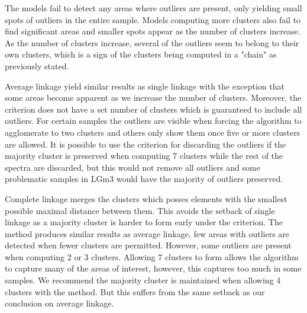 The models fail to detect any areas where outliers are present, only yielding small spots of outliers in the entire sample. Models computing more clusters also fail to find significant areas and smaller spots appear as the number of clusters increase. As the number of clusters increase, several of the outliers seem to belong to their own clusters, which is a sign of the clusters being computed in a "chain" as previously stated.


Average linkage yield similar results as single linkage with the exception that some areas become apparent as we increase the number of clusters. Moreover, the criterion does not have a set number of clusters which is guaranteed to include all outliers. For certain samples the outliers are visible when forcing the algorithm to agglomerate to two clusters and others only show them once five or more clusters are allowed. It is possible to use the criterion for discarding the outliers if the majority cluster is preserved when computing 7 clusters while the rest of the spectra are discarded, but this would not remove all outliers and some problematic samples in LGm3 would have the majority of outliers preserved. 

Complete linkage merges the clusters which posses elements with the smallest possible maximal distance between them. This avoids the setback of single linkage as a majority cluster is harder to form early under the criterion. The method produces similar results as average linkage, few areas with outliers are detected when fewer clusters are permitted. However, some outliers are present when computing 2 or 3 clusters. Allowing 7 clusters to form allows the algorithm to capture many of the areas of interest, however, this captures too much in some samples. We recommend the majority cluster is maintained when allowing 4 clusters with the method. But this suffers from the same setback as our conclusion on average linkage.

